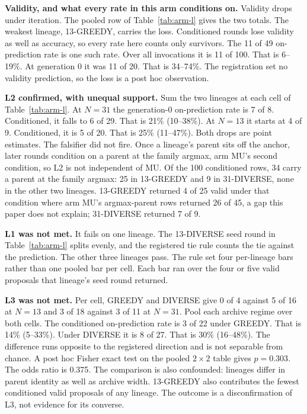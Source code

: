 \textbf{Validity, and what every rate in this arm conditions on.} Validity drops under
iteration. The pooled row of Table~\ref{tab:arm-l} gives the two totals. The weakest lineage,
13-GREEDY, carries the loss. Conditioned rounds lose validity as well as accuracy, so every
rate here counts only survivors. The 11 of 49 on-prediction rate is one such rate. Over all
invocations it is 11 of 100. That is 6--19\%. At generation 0 it was 11 of 20. That is
34--74\%. The registration set no validity prediction, so the loss is a post hoc
observation.

\textbf{L2 confirmed, with unequal support.} Sum the two lineages at each cell of
Table~\ref{tab:arm-l}. At $N = 31$ the generation-0 on-prediction rate is 7 of 8. Conditioned,
it falls to 6 of 29. That is 21\% (10--38\%). At
$N = 13$ it starts at 4 of 9. Conditioned, it is 5 of 20. That is 25\% (11--47\%). Both drops
are point estimates. The falsifier did not fire. Once a lineage's parent sits
off the anchor, later rounds condition on a parent at the family argmax, arm MU's second
condition, so L2 is not independent of MU. Of the 100 conditioned rows, 34 carry a parent at
the family argmax: 25 in 13-GREEDY and 9 in 31-DIVERSE, none in the other two lineages.
13-GREEDY returned 4 of 25 valid under that
condition where arm MU's argmax-parent rows returned 26 of 45, a gap this paper does not
explain; 31-DIVERSE returned 7 of 9.

\textbf{L1 was not met.} It fails on one lineage. The 13-DIVERSE seed round in
Table~\ref{tab:arm-l} splits evenly, and the registered tie rule counts the tie against the
prediction. The other three lineages pass. The rule set four per-lineage bars rather than one
pooled bar per cell. Each bar ran over the four or five valid proposals that lineage's seed
round returned.

\textbf{L3 was not met.} Per cell, GREEDY and DIVERSE give 0 of 4 against 5 of 16 at
$N = 13$ and 3 of 18 against 3 of 11 at $N = 31$. Pool each archive regime over both cells.
The conditioned
on-prediction rate is 3 of 22 under GREEDY. That is 14\% (5--33\%). Under DIVERSE it is 8 of
27. That is 30\% (16--48\%). The difference runs opposite to the
registered direction and is not separable from chance. A post hoc Fisher exact test on the
pooled $2 \times 2$ table gives $p = 0.303$. The odds ratio is 0.375. The comparison is also
confounded: lineages differ in parent identity as well as archive width. 13-GREEDY
also contributes the fewest conditioned valid proposals of any lineage. The outcome is a
disconfirmation of L3, not evidence for its converse.


